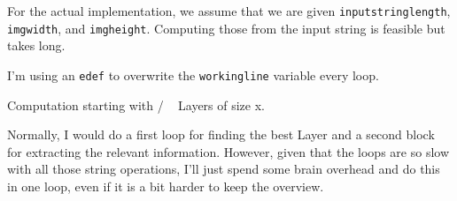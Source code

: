 \documentclass{article} \usepackage[utf8]{inputenc}
\begin{document}
For the actual implementation, we assume that we are given \texttt{inputstringlength}, \texttt{imgwidth}, and \texttt{imgheight}. Computing those from the input string is feasible but takes long.

I'm using an \texttt{edef} to overwrite the \texttt{workingline} variable every loop.

\def\workingline{\fileline}
%
\setcounter{layercounter}{0}
\bigskip\noindent
\def\numlayers{\the\numexpr {} / \layersize \relax}
Computation starting with \numlayers ~ Layers of size \the\imgwidth x\the\imgheight.
\setcounter{currentlayerzerocounter}{0}
\setcounter{bestlayercounter}{0}
\setcounter{bestlayerzerocountcounter}{\the\numexpr \layersize}
\setcounter{currentcharpos}{\the\numexpr 0 - 1}
\setcounter{charstoremoveatendoflayer}{0}

Normally, I would do a first loop for finding the best Layer and a second block for extracting the relevant information. However, given that the loops are so slow with all those string operations, I'll just spend some brain overhead and do this in one loop, even if it is a bit harder to keep the overview.\\


\loop
	\setcounter{charinlayercounter}{0}
    	\addtocounter{layercounter}{1}
	\setcounter{currentlayerzerocounter}{0}
	\setcounter{currentlayeronecounter}{0}
	\setcounter{currentlayertwocounter}{0}
	\setcounter{charstoremoveatendoflayer}{1}
	
\end{document}
